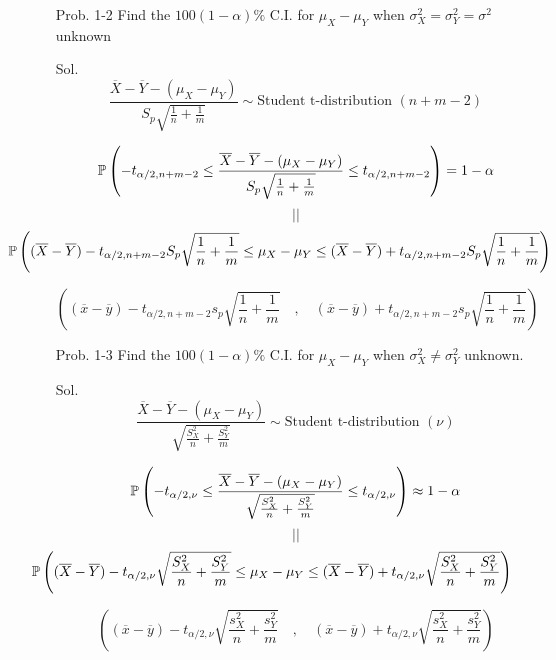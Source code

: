 \begin{frame}
\begin{enumerate}
\item[Prob. 1-2] Find the $100(1-\alpha)\%$ C.I. for $\mu_X-\mu_Y$ when $\sigma^2_X = \sigma^2_Y=\sigma^2$ unknown
	\vfill
\item[Sol.]
	\[
		\frac{\overline{X}-\overline{Y} - (\mu_X-\mu_Y)}{S_p\sqrt{\frac 1n + \frac 1m}}\sim \text{Student t-distribution $(n+m-2)$}
	\]
	\vfill
\item[]
	\[
		\mathbb{P} \left(-t_{\alpha/2,n+m-2} \le \frac{\overline{X}-\overline{Y} - (\mu_X-\mu_Y)}{S_p\sqrt{\frac 1n + \frac 1m}}\le t_{\alpha/2,n+m-2}\right ) = 1-\alpha
	\]
	\[||\]
	\[
		\hspace{-3.5em}	\bbP \left(
			(\overline{X}-\overline{Y})-t_{\alpha/2,n+m-2} S_p\sqrt{\frac 1n + \frac 1m}
			\le  \mu_X-\mu_Y \le
			(\overline{X}-\overline{Y})+t_{\alpha/2,n+m-2} S_p\sqrt{\frac 1n + \frac 1m}
		\right )
	\]
	\vfill
\item[]
	\[
		\left(
(\overline{x}-\overline{y})-t_{\alpha/2,n+m-2} s_p\sqrt{\frac 1n + \frac 1m}
\quad,\quad
(\overline{x}-\overline{y})+t_{\alpha/2,n+m-2} s_p\sqrt{\frac 1n + \frac 1m}
\right )
	\]
	\myEnd
\end{enumerate}
\end{frame}
\begin{frame}
\begin{enumerate}
\item[Prob. 1-3] Find the $100(1-\alpha)\%$ C.I. for $\mu_X-\mu_Y$ when $\sigma^2_X \ne \sigma^2_Y$ unknown.
	\vfill
\item[Sol.]
	\[
		\frac{\overline{X}-\overline{Y} - (\mu_X-\mu_Y)}{\sqrt{\frac{S_X^2}{n} + \frac{S_Y^2}{m} }}\sim \text{Student t-distribution $(\nu)$}
	\]
	\vfill
\item[]
	\[
		\mathbb{P} \left(-t_{\alpha/2,\nu} \le \frac{\overline{X}-\overline{Y} - (\mu_X-\mu_Y)}{\sqrt{\frac{S_X^2}{n} + \frac{S_Y^2}{m} }}\le t_{\alpha/2,\nu}\right ) \approx 1-\alpha
	\]
	\[||\]
	\[
		\hspace{-3.5em}	\bbP \left(
			(\overline{X}-\overline{Y})-t_{\alpha/2,\nu} \sqrt{\frac{S_X^2}{n} + \frac{S_Y^2}{m}}
			\le  \mu_X-\mu_Y \le
			(\overline{X}-\overline{Y})+t_{\alpha/2,\nu} \sqrt{\frac{S_X^2}{n} + \frac{S_Y^2}{m}}
		\right )
	\]
	\vfill
\item[]
	\[
		\left(
			(\overline{x}-\overline{y})-t_{\alpha/2,\nu} \sqrt{\frac{s_X^2}{n} + \frac{s_Y^2}{m}}
\quad,\quad
(\overline{x}-\overline{y})+t_{\alpha/2,\nu} \sqrt{\frac{s_X^2}{n} + \frac{s_Y^2}{m}}
\right )
	\]
	\myEnd
\end{enumerate}
\end{frame}
